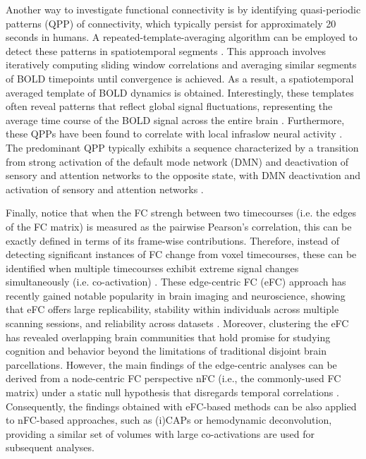 Another way to investigate functional connectivity is by identifying
quasi-periodic patterns (QPP) of connectivity, which typically persist for
approximately 20 seconds in humans. A repeated-template-averaging algorithm can
be employed to detect these patterns in spatiotemporal segments
\citep{Majeed2011Spatiotemporaldynamicslow}. This approach involves iteratively
computing sliding window correlations and averaging similar segments of BOLD
timepoints until convergence is achieved. As a result, a spatiotemporal averaged
template of BOLD dynamics is obtained. Interestingly, these templates often
reveal patterns that reflect global signal fluctuations, representing the
average time course of the BOLD signal across the entire brain
\citep{Yousefi2018Quasiperiodicpatterns,Bolt2022parsimoniousdescriptionglobal}.
Furthermore, these QPPs have been found to correlate with local
infraslow neural activity \citep{Thompson2014Quasiperiodicpatterns}. The
predominant QPP typically exhibits a sequence characterized by a transition from
strong activation of the default mode network (DMN) and deactivation of sensory
and attention networks to the opposite state, with DMN deactivation
and activation of sensory and attention networks
\citep{Abbas2019Quasiperiodicpatterns,Yousefi2021Propagatingpatternsintrinsic}.

Finally, notice that when the FC strengh between two timecourses (i.e. the edges
of the FC matrix) is measured as the pairwise Pearson's correlation, this can be
exactly defined in terms of its frame-wise contributions. Therefore, instead of
detecting significant instances of FC change from voxel timecourses, these can
be identified when multiple timecourses exhibit extreme signal changes
simultaneously (i.e. co-activation)
\citep{Esfahlani2020Highamplitudecofluctuations,Faskowitz2020Edgecentricfunctional}.
These edge-centric FC (eFC) approach has recently gained notable popularity in
brain imaging and neuroscience, showing that eFC offers large
replicability, stability within individuals across multiple scanning sessions,
and reliability across datasets \citep{Faskowitz2020Edgecentricfunctional}.
Moreover, clustering the eFC has revealed overlapping brain communities that
hold promise for studying cognition and behavior beyond the limitations of
traditional disjoint brain parcellations. However, the main findings of the
edge-centric analyses can be derived from a node-centric FC perspective
nFC (i.e., the commonly-used FC matrix) under a static null
hypothesis that disregards temporal correlations
\citep{Novelli2022mathematicalperspectiveedge}. Consequently, the findings
obtained with  eFC-based methods can be also applied to nFC-based approaches,
such as (i)CAPs or hemodynamic deconvolution, providing a similar set of volumes
with large co-activations are used for subsequent analyses.

